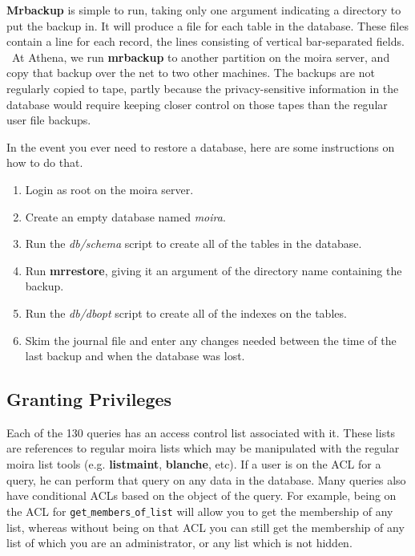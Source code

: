 {\bf Mrbackup} is simple to run, taking only one argument indicating a
directory to put the backup in.   It will produce a file for each
table in the database.  These files contain a line for each record,
the lines consisting of vertical bar-separated fields.  \athena\ At
Athena, we run {\bf mrbackup} to another partition on the moira server,
and copy that backup over the net to two other machines.  The backups
are not regularly copied to tape, partly because the privacy-sensitive
information in the database would require keeping closer control on
those tapes than the regular user file backups.

In the event you ever need to restore a database, here are some
instructions on how to do that.
\begin{enumerate}
\item Login as root on the moira server.
\item Create an empty database named {\em moira}.
\item Run the {\em db/schema} script to create all of the tables in the
database.
\item Run {\bf mrrestore}, giving it an argument of the directory name
containing the backup.
\item Run the {\em db/dbopt} script to create all of the indexes on the
tables.
\item Skim the journal file and enter any changes needed between the time of
the last backup and when the database was lost.
\end{enumerate}

\subsection{Granting Privileges}

Each of the 130 queries has an access control list associated with it.
These lists are references to regular moira lists which may be
manipulated with the regular moira list tools (e.g. {\bf listmaint},
{\bf blanche}, etc).  If a user is on the ACL for a query, he can
perform that query on any data in the database.  Many queries also
have conditional ACLs based on the object of the query.  For example,
being on the ACL for {\tt get$\_$members$\_$of$\_$list} will allow you
to get the membership of any list, whereas without being on that ACL
you can still get the membership of any list of which you are an
administrator, or any list which is not hidden.

